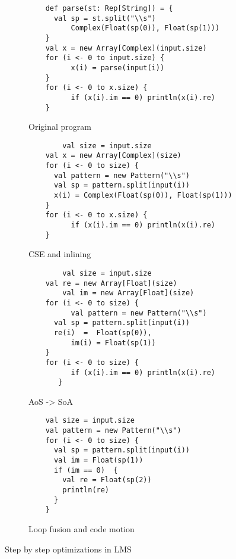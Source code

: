 \begin{figure*}
  \begin{subfigure}[b]{.5\linewidth}
    \begin{lstlisting}
  	def parse(st: Rep[String]) = {               
	  val sp = st.split("\\s")
          Complex(Float(sp(0)), Float(sp(1)))
	}
	val x = new Array[Complex](input.size)
	for (i <- 0 to input.size) {
     	  x(i) = parse(input(i)) 
	}
	for (i <- 0 to x.size) {
    	  if (x(i).im == 0) println(x(i).re) 
	}
    \end{lstlisting}
    \caption{Original program}
    \label{lst:original}
  \end{subfigure}
  \begin{subfigure}[b]{.5\linewidth}
    \begin{lstlisting}
        val size = input.size
	val x = new Array[Complex](size)
	for (i <- 0 to size) {
   	  val pattern = new Pattern("\\s") 
	  val sp = pattern.split(input(i))
	  x(i) = Complex(Float(sp(0)), Float(sp(1))) 
	}
	for (i <- 0 to x.size) {
          if (x(i).im == 0) println(x(i).re) 
	}
    \end{lstlisting}
    \caption{CSE and inlining}
  \end{subfigure}
  \begin{subfigure}[b]{.5\linewidth}
    \begin{lstlisting}
        val size = input.size
	val re = new Array[Float](size)
        val im = new Array[Float](size)
	for (i <- 0 to size) {
          val pattern = new Pattern("\\s") 
   	  val sp = pattern.split(input(i))
	  re(i)  =  Float(sp(0)),
          im(i) = Float(sp(1)) 
	}
	for (i <- 0 to size) {
          if (x(i).im == 0) println(x(i).re) 
       }
    \end{lstlisting}
    \label{lst:aos-soa}
    \caption{AoS -> SoA}
  \end{subfigure}
\begin{subfigure}[b]{.5\linewidth}
    \begin{lstlisting}
	val size = input.size
	val pattern = new Pattern("\\s") 
	for (i <- 0 to size) {
	  val sp = pattern.split(input(i))
 	  val im = Float(sp(1))
	  if (im == 0)  {
	    val re = Float(sp(2))
 	    println(re) 
   	  }
	}
    \end{lstlisting}
    \caption{Loop fusion and code motion}
    \label{lst:fusion-motion}
  \end{subfigure}
  \caption{Step by step optimizations in LMS}
  \label{lst:step-by-step-lms}
\end{figure*}
